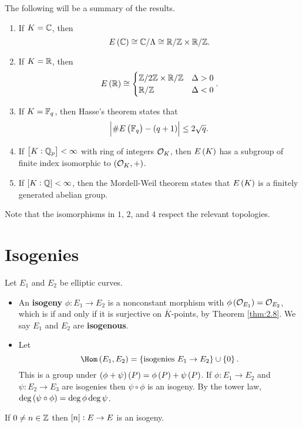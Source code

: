 The following will be a summary of the results.
\begin{enumerate}
\item If $ K = \mathbb{C} $, then
$$ E\br{\CC} \cong \CC / \Lambda \cong \RR / \ZZ \times \RR / \ZZ. $$
\item If $ K = \mathbb{R} $, then
$$ E\br{\RR} \cong
\begin{cases}
\ZZ / 2\ZZ \times \RR / \ZZ & \Delta > 0 \\
\RR / \ZZ & \Delta < 0
\end{cases}.
$$
\item If $ K = \mathbb{F}_q $, then Hasse's theorem states that
$$ \abs{\#E\br{\FF_q} - \br{q + 1}} \le 2\sqrt{q}. $$
\item If $ \sbr{K : \QQ_p} < \infty $ with ring of integers $ \mathcal{O}_K $, then $ E\br{K} $ has a subgroup of finite index isomorphic to $ \br{\OOO_K, +} $.
\item If $ \sbr{K : \QQ} < \infty $, then the Mordell-Weil theorem states that $ E\br{K} $ is a finitely generated abelian group.
\end{enumerate}
Note that the isomorphisms in $ 1 $, $ 2 $, and $ 4 $ respect the relevant topologies.

\pagebreak

\section{Isogenies}


\begin{definition*}
Let $ E_1 $ and $ E_2 $ be elliptic curves.
\begin{itemize}
\item An \textbf{isogeny} $ \phi : E_1 \to E_2 $ is a nonconstant morphism with $ \phi\br{\OOO_{E_1}} = \OOO_{E_2} $, which is if and only if it is surjective on $ \overline{K} $-points, by Theorem \ref{thm:2.8}. We say $ E_1 $ and $ E_2 $ are \textbf{isogenous}.
\item Let
$$ \Hom\br{E_1, E_2} = \cbr{\text{isogenies} \ E_1 \to E_2} \cup \cbr{0}. $$
This is a group under $ \br{\phi + \psi}\br{P} = \phi\br{P} + \psi\br{P} $. If $ \phi : E_1 \to E_2 $ and $ \psi : E_2 \to E_3 $ are isogenies then $ \psi \circ \phi $ is an isogeny. By the tower law, $ \deg \br{\psi \circ \phi}  = \deg \phi\deg \psi $.
\end{itemize}
\end{definition*}

\begin{lemma}
If $ 0 \ne n \in \mathbb{Z} $ then $ \sbr{n} : E \to E $ is an isogeny.
\end{lemma}

